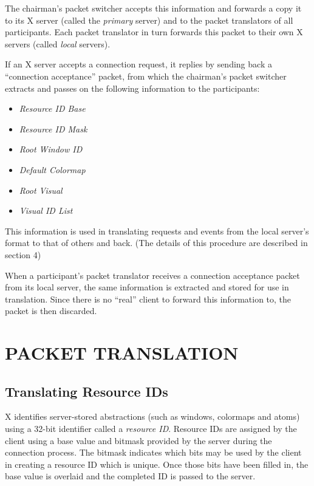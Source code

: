 \noindent

The chairman's packet switcher accepts this information and
forwards a copy it to its X server (called the {\it primary} server)
and to the packet translators of all participants.  Each packet translator
in turn forwards this packet to their own X servers (called {\it local}
servers).

If an X server accepts a connection request, it replies by sending back
a ``connection acceptance'' packet, from which the chairman's packet
switcher extracts and passes on the following information to the
participants:

\begin{itemize}
\item {\it Resource ID Base}
\item {\it Resource ID Mask}
\item {\it Root Window ID}
\item {\it Default Colormap}
\item {\it Root Visual}
\item {\it Visual ID List}
\end{itemize}

\noindent
This information is used in translating requests and events from the
local server's format to that of others and back.  (The details of this
procedure are described in section 4)

When a participant's packet translator receives a connection acceptance
packet from its local server, the same information is extracted and
stored for use in translation.  Since there is no ``real'' client to
forward this information to, the packet is then discarded.

%
%
\section{PACKET TRANSLATION}

\subsection{Translating Resource IDs}

X identifies server-stored abstractions (such as windows, colormaps and
atoms) using a 32-bit identifier called a {\it resource ID}.  Resource
IDs are assigned by the client using a base value and bitmask provided
by the server during the connection process.  The bitmask indicates
which bits may be used by the client in creating a resource ID which is
unique.  Once those bits have been filled in, the base value is
overlaid and the completed ID is passed to the server.

